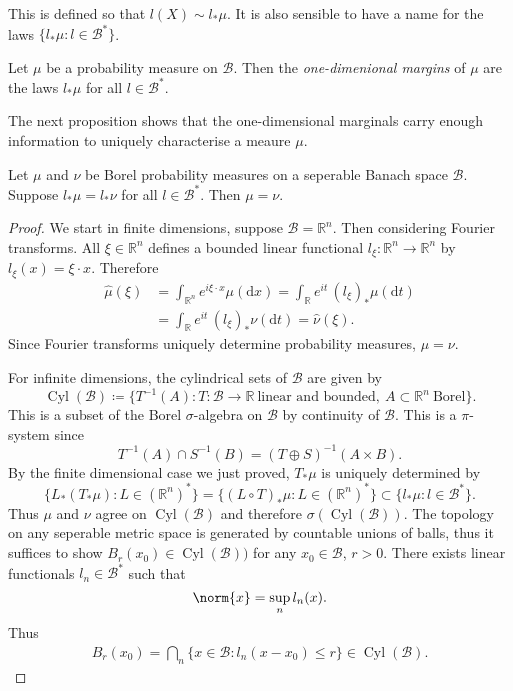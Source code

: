 \documentclass[fontsize=12pt, DIV=12]{scrreprt}
\newcommand{\defeq}{\coloneqq}
\newcommand{\R}{\mathbb R}
\newcommand{\calB}{\mathcal B}
\newcommand{\dif}[1]{\text{d} #1}
\DeclareMathOperator{\cyl}{Cyl}
\begin{document}
This is defined so that $l(X) \sim l_* \mu$. It is also sensible to have a name for the laws $\{l_* \mu : l \in \calB^*\}$.
\begin{defn}
	Let $\mu$ be a probability measure on $\calB$. Then the \emph{one-dimenional margins} of $\mu$ are the laws $l_* \mu$ for all $l \in \calB^*$.
\end{defn}

The next proposition shows that the one-dimensional marginals carry enough information to uniquely characterise a meaure $\mu$.
\begin{prop}
	\label{prop:one-dim-marginals}
	Let $\mu$ and $\nu$ be Borel probability measures on a seperable Banach space $\calB$. Suppose $l_* \mu = l_* \nu$ for all $l \in \calB^*$. Then $\mu = \nu$.
\end{prop}
\begin{proof}
	We start in finite dimensions, suppose $\calB = \R^n$. Then considering Fourier transforms. All $\xi \in \R^n$ defines a bounded linear functional $l_{\xi}: \R^n \to \R^n$ by $l_{\xi}(x) = \xi \cdot x$. Therefore
	\begin{align}
		\hat{\mu}(\xi)
		&= \int_{\R^n} e^{i \xi \cdot x} \mu(\dif x)
		= \int_{\R} e^{i t} \, (l_{\xi})_*\mu(\dif t) \\
		&= \int_{\R} e^{i t} \, (l_{\xi})_*\nu(\dif t)
		= \hat{\nu}(\xi).
	\end{align}
	Since Fourier transforms uniquely determine probability measures, $\mu = \nu$.
	
	For infinite dimensions, the cylindrical sets of $\calB$ are given by
	\begin{equation}
		\cyl(\calB) \defeq \{T^{-1}(A) : T: \calB \to \R\ \text{linear and bounded},\ A \subset \R^n\ \text{Borel}\}.
	\end{equation}
	This is a subset of the Borel $\sigma$-algebra on $\calB$ by continuity of $\calB$. This is a $\pi$-system since 
	\begin{equation}
		T^{-1}(A) \cap S^{-1}(B) = (T \oplus S)^{-1}(A \times B).
	\end{equation}
	By the finite dimensional case we just proved, $T_* \mu$ is uniquely determined by
	\begin{equation}
		\{L_*(T_* \mu) : L \in (\R^n)^* \} = \{ (L \circ T)_* \mu : L \in (\R^n)^* \}
		\subset \{l_* \mu : l \in \calB^*\}.
	\end{equation}
	Thus $\mu$ and $\nu$ agree on $\cyl(\calB)$ and therefore $\sigma(\cyl(\calB))$. The topology on any seperable metric space is generated by countable unions of balls, thus it suffices to show $B_r(x_0) \in \cyl(\calB))$ for any $x_0 \in \calB$, $r > 0$. There exists linear functionals $l_n \in \calB^*$ such that 
	\begin{equation}
		\norm{x} = \sup_n l_n(x).
	\end{equation}
	Thus
	\begin{align}
		B_r(x_0) = \bigcap_n \{x \in \calB : l_n(x - x_0) \leq r \} \in \cyl(\calB).
	\end{align}
\end{proof}
\end{document}
